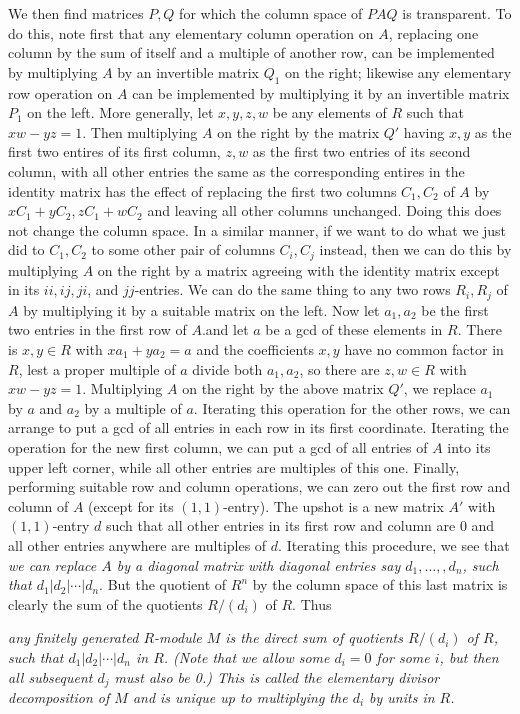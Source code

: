 We then find matrices $P,Q$ for which the column space of $PAQ$ is transparent.  To do this, note first that any elementary column operation on $A$, replacing one column by the sum of itself and a multiple of another row, can be implemented by multiplying $A$ by an invertible matrix $Q_1$ on the right; likewise any elementary row operation on $A$ can be implemented by multiplying it by an invertible matrix $P_1$ on the left.  More generally, let $x,y,z,w$ be any elements of $R$ such that
$xw - yz = 1$.  Then multiplying $A$ on the right by the matrix $Q'$ having $x,y$ as the first two entires of its first column, $z,w$ as the first two entries of its second column, with all other entries the same as the corresponding entires in the identity matrix has the effect of replacing the first two columns $C_1,C_2$ of $A$ by $xC_1+yC_2,zC_1+wC_2$ and leaving all other columns unchanged.  Doing this does not change the column space.  In a similar manner, if we want to do what we just did to $C_1,C_2$ to some other pair of columns $C_i,C_j$ instead, then we can do this by multiplying $A$ on the right by a matrix agreeing with the identity matrix except in its $ii,ij,ji$, and $jj$-entries.  We can do the same thing to any two rows $R_i,R_j$ of $A$ by multiplying it by a suitable matrix on the left.  Now let $a_1,a_2$ be the first two entries in the first row of $A$.and let $a$ be a gcd of these elements in $R$.  There is $x,y\in R$ with $xa_1 + ya_2 = a$ and the coefficients $x,y$ have no common factor in $R$, lest a proper multiple of $a$ divide both $a_1,a_2$, so there are $z,w\in R$ with $xw - yz = 1$.  Multiplying $A$ on the right by the above matrix $Q'$, we replace $a_1$ by $a$ and $a_2$ by a multiple of $a$.  Iterating this operation for the other rows, we can arrange to put a gcd of all entries in each row in its first coordinate.  Iterating the operation for the new first column, we can put a gcd of all entries of $A$ into its upper left corner, while all other entries are multiples of this one.  Finally, performing suitable row and column operations, we can zero out the first row and column of $A$ (except for its $(1,1)$-entry).  The upshot is a new matrix $A'$ with $(1,1)$-entry $d$ such that all other entries in its first row and column are 0 and all other entries anywhere are multiples of $d$.  Iterating this procedure, we see that {\sl we can replace $A$ by a diagonal matrix with diagonal entries say $d_1,\ldots,,d_n$, such that $d_1 | d_2 | \cdots | d_n$}.  But the quotient of $R^n$ by the column space of this last matrix is clearly the sum of the quotients $R/(d_i)$ of $R$.  Thus {\sl any finitely generated $R$-module $M$ is the direct sum of quotients $R/(d_i)$ of $R$, such that
$d_1 | d_2 | \cdots | d_n$ in $R$.  (Note that we allow some $d_i = 0$ for some $i$, but then all subsequent $d_j$ must also be 0.)  This is called the {\sl elementary divisor decomposition of $M$} and is unique up to multiplying the $d_i$ by units in $R$.

}
